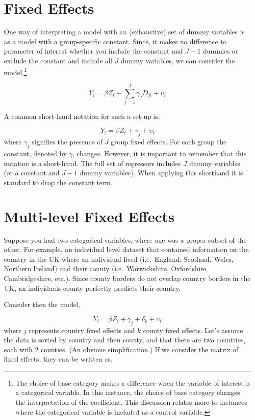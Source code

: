 \documentclass[
  letterpaper,
  DIV=11,
  numbers=noendperiod]{scrreprt}
\begin{document}
\hypertarget{fixed-effects}{%
\section{Fixed Effects}\label{fixed-effects}}

One way of interpreting a model with an (exhaustive) set of dummy
variables is as a model with a group-specific constant. Since, it makes
no difference to parameter of interest whether you include the constant
and \(J-1\) dummies or exclude the constant and include all \(J\) dummy
variables, we can consider the model,\footnote{The choice of base
  category makes a difference when the variable of interest is a
  categorical variable. In this instance, the choice of base category
  changes the interpretation of the coefficient. This discussion relates
  more to instances where the categorical variable is included as a
  control variable.}

\[
Y_i = \beta Z_i + \sum_{j=1}^J \gamma_j D_{ji} + \upsilon_i
\]

A common short-hand notation for such a set-up is,

\[
Y_i = \beta Z_i + \gamma_j + \upsilon_i
\] where \(\gamma_j\) signifies the presence of \(J\) group fixed
effects. For each group the constant, denoted by \(\gamma\), changes.
However, it is important to remember that this notation is a short-hand.
The full set of regressors includes \(J\) dummy variables (or a constant
and \(J-1\) dummy variables). When applying this shorthand it is
standard to drop the constant term.

\hypertarget{multi-level-fixed-effects}{%
\section{Multi-level Fixed Effects}\label{multi-level-fixed-effects}}

Suppose you had two categorical variables, where one was a proper subset
of the other. For example, an individual level dataset that contained
information on the country in the UK where an individual lived
(i.e.~England, Scotland, Wales, Northern Ireland) and their county
(i.e.~Warwickshire, Oxfordshire, Cambridgeshire, etc.). Since county
borders do not overlap country borders in the UK, an individuals county
perfectly predicts their country.

Consider then the model,

\[
Y_i = \beta Z_i + \gamma_j + \delta_k + \upsilon_i
\] where \(j\) represents country fixed effects and \(k\) county fixed
effects. Let's assume the data is sorted by country and then county, and
that there are two countries, each with 2 counties. (An obvious
simplification.) If we consider the matrix of fixed effects, they can be
written as,
\end{document}
